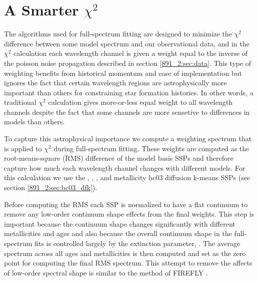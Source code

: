 \section{A Smarter $\chi^2$}
\label{891_2:sec:smart_chi}

The algorithms used for full-spectrum fitting are designed to minimize
the $\chi^2$ difference between some model spectrum and our
observational data, and in the $\chi^2$ calculation each wavelength
channel is given a weight equal to the inverse of the poisson noise
propagation described in section \ref{891_2:sec:data}. This type of
weighting benefits from historical momentum and ease of implementation
but ignores the fact that certain wavelength regions are
astrophysically more important than others for constraining star
formation histories. In other words, a traditional $\chi^2$
calculation gives more-or-less equal weight to all wavelength channels
despite the fact that some channels are more sensetive to differences
in models than others.



To capture this astrophysical importance we compute a weighting
spectrum that is applied to $\chi^2$ during full-spectrum
fitting. These weights are computed as the root-means-square (RMS)
difference of the model basis SSPs and therefore capture how much each
wavelength channel changes with different models. For this calculation
we use the , , , and
 metallicity bc03 diffusion k-means SSPs (see section
\ref{891_2:sec:bc03_dfk}).


Before computing the RMS each SSP is normalized to have a flat
continuum to remove any low-order continuum shape effects from the
final weights. This step is important because the continuum shape
changes significantly with different metallicities and ages and also
because the overall continuum shape in the full-spectrum fits is
controlled largely by the extinction parameter, \tauV. The average
spectrum across all ages and metallicities is then computed and set as
the zero point for computing the final RMS spectrum. This attempt to
remove the affects of low-order spectral shape is similar to the
method of FIREFLY \citep{Wilkinson15}.

